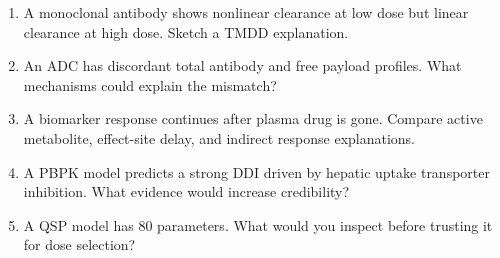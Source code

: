 \begin{enumerate}[leftmargin=2em]
  \item A monoclonal antibody shows nonlinear clearance at low dose but linear clearance at high dose. Sketch a TMDD explanation.
  \item An ADC has discordant total antibody and free payload profiles. What mechanisms could explain the mismatch?
  \item A biomarker response continues after plasma drug is gone. Compare active metabolite, effect-site delay, and indirect response explanations.
  \item A PBPK model predicts a strong DDI driven by hepatic uptake transporter inhibition. What evidence would increase credibility?
  \item A QSP model has 80 parameters. What would you inspect before trusting it for dose selection?
\end{enumerate}

